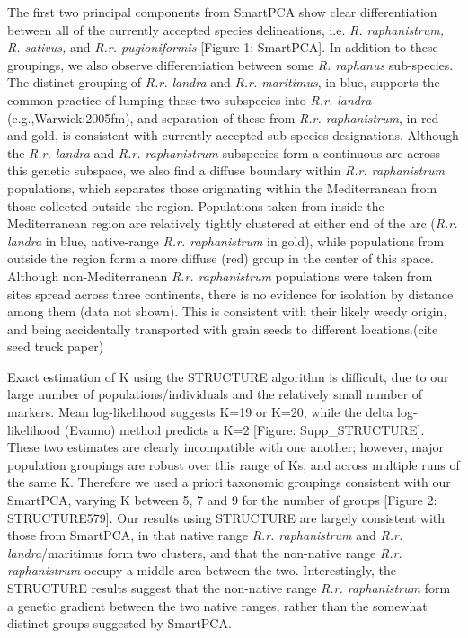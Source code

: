 \documentclass[twocolumn]{bmcart}%
\begin{document}
The first two principal components from SmartPCA show clear differentiation between all of the currently accepted species delineations, i.e. \textit{R. raphanistrum, R. sativus,} and \textit{R.r. pugioniformis} [Figure 1: SmartPCA]. In addition to these groupings, we also observe differentiation between some \textit{R. raphanus} sub-species. The distinct grouping of \textit{R.r. landra} and \textit{R.r. maritimus}, in blue, supports the common practice of lumping these two subspecies into \textit{R.r. landra} (e.g.,{Warwick:2005fm}), and separation of these from \textit{R.r. raphanistrum}, in red and gold, is consistent with currently accepted sub-species designations. Although the \textit{R.r. landra} and \textit{R.r. raphanistrum} subspecies form a continuous arc across this genetic subspace, we also find a diffuse boundary within \textit{R.r. raphanistrum} populations, which separates those originating within the Mediterranean from those collected outside the region. Populations taken from inside the Mediterranean region are relatively tightly clustered at either end of the arc (\textit{R.r. landra} in blue, native-range \textit{R.r. raphanistrum} in gold), while populations from outside the region form a more diffuse (red) group in the center of this space. Although non-Mediterranean \textit{R.r. raphanistrum} populations were taken from sites spread across three continents, there is no evidence for isolation by distance among them (data not shown). This is consistent with their likely weedy origin, and being accidentally transported with grain seeds to different locations.(cite seed truck paper)

Exact estimation of K using the STRUCTURE algorithm is difficult, due to our large number of populations/individuals and the relatively small number of markers. Mean log-likelihood suggests K=19 or K=20, while the delta log-likelihood (Evanno) method predicts a K=2 [Figure: Supp\_STRUCTURE]. These two estimates are clearly incompatible with one another; however, major population groupings are robust over this range of Ks, and across multiple runs of the same K. Therefore we used a priori taxonomic groupings consistent with our SmartPCA, varying K between 5, 7 and 9 for the number of groups [Figure 2: STRUCTURE579]. Our results using STRUCTURE are largely consistent with those from SmartPCA, in that native range \textit{R.r. raphanistrum} and \textit{R.r. landra}/maritimus form two clusters, and that the non-native range \textit{R.r. raphanistrum} occupy a middle area between the two. Interestingly, the STRUCTURE results suggest that the non-native range \textit{R.r. raphanistrum} form a genetic gradient between the two native ranges, rather than the somewhat distinct groups suggested by SmartPCA.
\end{document}
